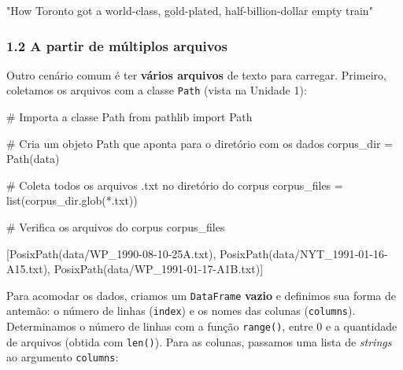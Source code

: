 \documentclass[
  brazilian,
  11pt,
]{article}
\newenvironment{Shaded}{\begin{snugshade}}{\end{snugshade}}
\newcommand{\BuiltInTok}[1]{\textcolor[rgb]{0.50,0.55,0.55}{#1}}
\newcommand{\CommentTok}[1]{\textcolor[rgb]{0.48,0.49,0.49}{#1}}
\newcommand{\ImportTok}[1]{\textcolor[rgb]{0.15,0.68,0.38}{#1}}
\newcommand{\NormalTok}[1]{\textcolor[rgb]{0.81,0.81,0.76}{#1}}
\newcommand{\OperatorTok}[1]{\textcolor[rgb]{0.81,0.81,0.76}{#1}}
\newcommand{\StringTok}[1]{\textcolor[rgb]{0.96,0.31,0.31}{#1}}
\let\oldtexttt\texttt
\renewcommand{\texttt}[1]{{\color{inlink}\oldtexttt{#1}}}
\begin{document}
\begin{Shaded}
\begin{Highlighting}[]
\NormalTok{"How Toronto got a \textquotesingle{}world{-}class,\textquotesingle{} gold{-}plated, half{-}billion{-}dollar empty train"}
\end{Highlighting}
\end{Shaded}

\subsubsection{1.2 A partir de múltiplos
arquivos}\label{a-partir-de-muxfaltiplos-arquivos}

Outro cenário comum é ter \textbf{vários arquivos} de texto para
carregar. Primeiro, coletamos os arquivos com a classe \texttt{Path}
(vista na Unidade 1):

\begin{Shaded}
\begin{Highlighting}[]
\CommentTok{\# Importa a classe Path}
\ImportTok{from}\NormalTok{ pathlib }\ImportTok{import}\NormalTok{ Path}

\CommentTok{\# Cria um objeto Path que aponta para o diretório com os dados}
\NormalTok{corpus\_dir }\OperatorTok{=}\NormalTok{ Path(}\StringTok{\textquotesingle{}data\textquotesingle{}}\NormalTok{)}

\CommentTok{\# Coleta todos os arquivos .txt no diretório do corpus}
\NormalTok{corpus\_files }\OperatorTok{=} \BuiltInTok{list}\NormalTok{(corpus\_dir.glob(}\StringTok{\textquotesingle{}*.txt\textquotesingle{}}\NormalTok{))}

\CommentTok{\# Verifica os arquivos do corpus}
\NormalTok{corpus\_files}
\end{Highlighting}
\end{Shaded}

\begin{Shaded}
\begin{Highlighting}[]
\NormalTok{[PosixPath(\textquotesingle{}data/WP\_1990{-}08{-}10{-}25A.txt\textquotesingle{}),}
\NormalTok{ PosixPath(\textquotesingle{}data/NYT\_1991{-}01{-}16{-}A15.txt\textquotesingle{}),}
\NormalTok{ PosixPath(\textquotesingle{}data/WP\_1991{-}01{-}17{-}A1B.txt\textquotesingle{})]}
\end{Highlighting}
\end{Shaded}

Para acomodar os dados, criamos um \texttt{DataFrame} \textbf{vazio} e
definimos sua forma de antemão: o número de linhas (\texttt{index}) e os
nomes das colunas (\texttt{columns}). Determinamos o número de linhas
com a função \texttt{range()}, entre 0 e a quantidade de arquivos
(obtida com \texttt{len()}). Para as colunas, passamos uma lista de
\emph{strings} ao argumento \texttt{columns}:
\end{document}
